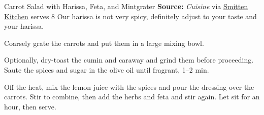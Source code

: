 \begin{recipe}{Carrot Salad with Harissa, Feta, and Mint}{grater \hfill} %
 {\textbf{Source:} \textit{Cuisine} via \href{https://smittenkitchen.com/2010/05/carrot-salad-with-harissa-feta-and-mint/}{Smitten Kitchen} \hfill serves 8}
 \freeform Our harissa is not very spicy, definitely adjust to your taste and your harissa.

 Coarsely grate the carrots and put them in a large mixing bowl.

 Optionally, dry-toast the cumin and caraway and grind them before proceeding. Saute the spices and sugar in the olive oil until fragrant, 1--2 min.

 Off the heat, mix the lemon juice with the spices and pour the dressing over the carrots. Stir to combine, then add the herbs and feta and stir again. Let sit for an hour, then serve.
\end{recipe}
